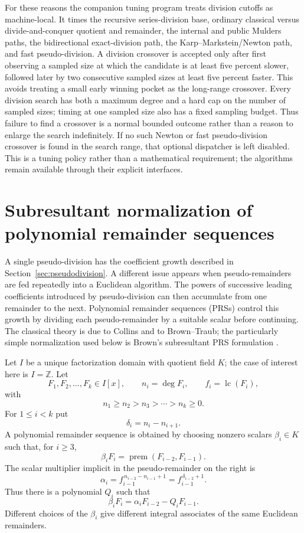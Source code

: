 \documentclass[11pt]{book}
\theoremstyle{definition}
\newcommand{\ZZ}{\mathbb Z}
\begin{document}
For these reasons the companion tuning program treats division cutoffs as
machine-local.  It times the recursive series-division base, ordinary
classical versus divide-and-conquer quotient and remainder, the internal and
public Mulders paths, the bidirectional exact-division path, the
Karp--Markstein/Newton path, and fast pseudo-division.  A division crossover is
accepted only after first observing a sampled size at which the candidate is
at least five percent slower, followed later by two consecutive sampled sizes
at least five percent faster.  This avoids treating a small early winning
pocket as the long-range crossover.  Every division search has both a maximum
degree and a hard cap on the number of sampled sizes; timing at one sampled
size also has a fixed sampling budget.  Thus failure to find a crossover is a
normal bounded outcome rather than a reason to enlarge the search indefinitely.
If no such Newton or fast pseudo-division crossover is found in the search
range, that optional dispatcher is left disabled.  This is a tuning policy
rather than a mathematical requirement; the algorithms remain available
through their explicit interfaces.


\section{Subresultant normalization of polynomial remainder sequences}
\label{sec:subresultant-prs}

A single pseudo-division has the coefficient growth described in
Section~\ref{sec:pseudodivision}.  A different issue appears when
pseudo-remainders are fed repeatedly into a Euclidean algorithm.  The powers
of successive leading coefficients introduced by pseudo-division can then
accumulate from one remainder to the next.  Polynomial remainder sequences
(PRSs) control this growth by dividing each pseudo-remainder by a suitable
scalar before continuing.  The classical theory is due to Collins and to
Brown--Traub; the particularly simple normalization used below is Brown's
subresultant PRS formulation \cite{BrownTraub1971,Brown1978}.

Let $I$ be a unique factorization domain with quotient field $K$; the case of
interest here is $I=\ZZ$.  Let
\[
 F_1,F_2,\ldots,F_k\in I[x],
 \qquad
 n_i=\deg F_i,
 \qquad
 f_i=\operatorname{lc}(F_i),
\]
with
\[
 n_1\ge n_2>n_3>\cdots>n_k\ge0.
\]
For $1\le i<k$ put
\[
 \delta_i=n_i-n_{i+1}.
\]
A polynomial remainder sequence is obtained by choosing nonzero scalars
$\beta_i\in K$ such that, for $i\ge3$,
\begin{equation}\label{eq:prs-defining-relation}
 \beta_i F_i
 =\operatorname{prem}(F_{i-2},F_{i-1}).
\end{equation}
The scalar multiplier implicit in the pseudo-remainder on the right is
\begin{equation}\label{eq:prs-alpha}
 \alpha_i=f_{i-1}^{\,n_{i-2}-n_{i-1}+1}
          =f_{i-1}^{\,\delta_{i-2}+1}.
\end{equation}
Thus there is a polynomial $Q_i$ such that
\[
 \beta_iF_i=\alpha_iF_{i-2}-Q_iF_{i-1}.
\]
Different choices of the $\beta_i$ give different integral associates of the
same Euclidean remainders.
\end{document}
